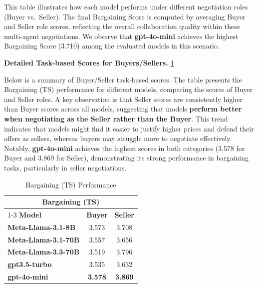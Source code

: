 \noindent
This table illustrates how each model performs under different negotiation roles (Buyer vs.\ Seller). The final Bargaining Score is computed by averaging Buyer and Seller role scores, reflecting the overall collaboration quality within these multi-agent negotiations. We observe that \textbf{gpt-4o-mini} achieves the highest Bargaining Score (3.710) among the evaluated models in this scenario.

\textbf{Detailed Task-based Scores for Buyers/Sellers.} \ref{detailed task scores for Buyers/Sellers}

Below is a summary of Buyer/Seller task-based scores. The table presents the Bargaining (TS) performance for different models, comparing the scores of Buyer and Seller roles. A key observation is that Seller scores are consistently higher than Buyer scores across all models, suggesting that models \textbf{perform better when negotiating as the Seller rather than the Buyer}. This trend indicates that models might find it easier to justify higher prices and defend their offers as sellers, whereas buyers may struggle more to negotiate effectively. Notably, \textbf{gpt-4o-mini} achieves the highest scores in both categories (3.578 for Buyer and 3.869 for Seller), demonstrating its strong performance in bargaining tasks, particularly in seller negotiations.
\begin{table}[h]
    \centering
    \renewcommand{\arraystretch}{1.2} 
    \setlength{\tabcolsep}{10pt} %
    
    \begin{tabular}{l c c}
        \toprule
        \multicolumn{3}{c}{\textbf{Bargaining (TS)}} \\ 
        \cmidrule(lr){1-3} 
        \textbf{Model} & \textbf{Buyer} & \textbf{Seller} \\
        \midrule
        \textbf{Meta-Llama-3.1-8B} & 3.573 & 3.708 \\
        \textbf{Meta-Llama-3.1-70B} & 3.557 & 3.656 \\
        \textbf{Meta-Llama-3.3-70B} & 3.519 & 3.796 \\
        \midrule
        \textbf{gpt3.5-turbo} & 3.535 & 3.632 \\
        \textbf{gpt-4o-mini} & \textbf{3.578} & \textbf{3.869} \\
        \bottomrule
    \end{tabular}

    \caption{Bargaining (TS) Performance}
    \label{detailed task scores for Buyers/Sellers}
\end{table}

